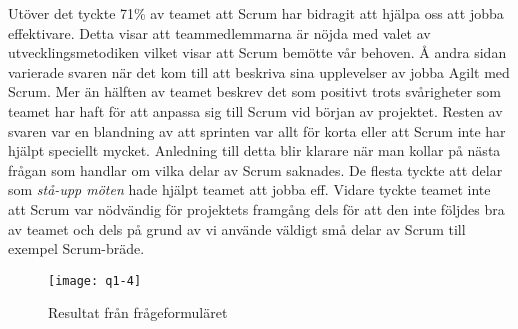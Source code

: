Utöver det tyckte 71\% av teamet att Scrum har bidragit att hjälpa oss att jobba effektivare. Detta visar att teammedlemmarna är nöjda med valet av utvecklingsmetodiken vilket visar att Scrum bemötte vår behoven. Å andra sidan varierade svaren när det kom till att beskriva sina upplevelser av jobba Agilt med Scrum. Mer än hälften av teamet beskrev det som positivt trots svårigheter som teamet har haft för att anpassa sig till Scrum vid början av projektet. Resten av svaren var en blandning av att sprinten var allt för korta eller att Scrum inte har hjälpt speciellt mycket. Anledning till detta blir klarare när man kollar på nästa frågan som handlar om vilka delar av Scrum saknades. De flesta tyckte att delar som \textit{stå-upp möten} hade  hjälpt teamet att jobba eff. Vidare tyckte teamet inte att Scrum var nödvändig för projektets framgång dels för att den inte följdes bra av teamet och dels på grund av vi använde väldigt små delar av Scrum till exempel Scrum-bräde.

\begin{figure*}[h]
	\centering
	\texttt{[image: q1-4]}
	\caption{Resultat från frågeformuläret}
	\label{q1}
\end{figure*}